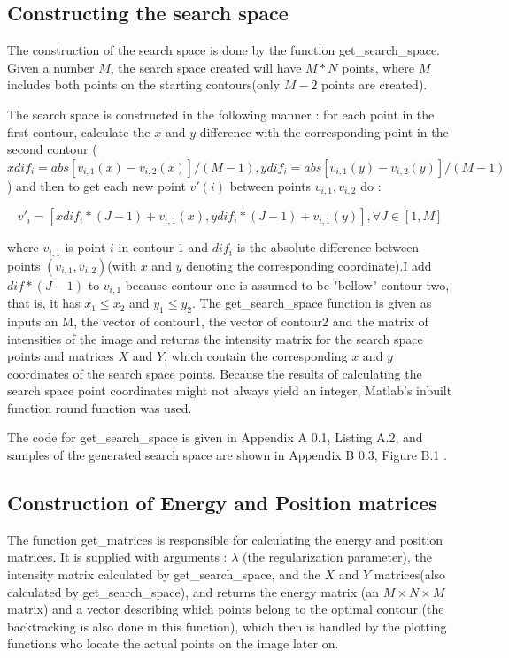 \documentclass[12pt,onecolumn,a4paper]{report}
\begin{document}
\subsection{Constructing the search space}
The construction of the search space is done by the function {\pica get\_search\_space}. Given a number $M$, the search space created will have $M*N$ points, where $M$ includes both points on the starting contours(only $M-2$ points are created). 

The search space is constructed in the following manner : 
for each point in the first contour, calculate the $x$ and $y$ difference with the corresponding point in the second contour ($ xdif_i = abs[v_{i,1}(x) - v_{i,2}(x)]/(M-1),ydif_i = abs[v_{i,1}(y) - v_{i,2}(y)]/(M-1) $) and then to get each new point $v'(i)$ between points $v_{i,1},v_{i,2}$ do :

\begin{displaymath}
v'_i = [xdif_i*(J-1)+v_{i,1}(x),ydif_i*(J-1)+v_{i,1}(y)], \forall J \in [1,M]
\end{displaymath}

where $v_{i,1}$ is point $i$ in contour $1$ and $dif_i$ is the absolute difference between points $(v_{i,1},v_{i,2})$(with $x$ and $y$ denoting the corresponding coordinate).I add $dif*(J-1)$ to $v_{i,1}$ because contour one is assumed to be "bellow" contour two, that is, it has $x_1 \leq x_2$ and $y_1 \leq y_2$.
The {\pica get\_search\_space} function is given as inputs an M, the vector of contour1, the vector of contour2 and the matrix of intensities of the image and returns the intensity matrix for the search space points and matrices $X$ and $Y$, which contain the corresponding $x$ and $y$ coordinates of the search space points.
Because the results of calculating the search space point coordinates might not always yield an integer, Matlab's inbuilt function {\pica round} function was used.

The code for {\pica get\_search\_space} is given in Appendix A 0.1, Listing A.2, and samples of the generated search space are shown in Appendix B 0.3, Figure B.1 . 

\subsection{Construction of Energy and Position matrices}

The function {\pica get\_matrices} is responsible for calculating the energy and position matrices. It is supplied with arguments : $\lambda$ (the regularization parameter), the intensity matrix calculated by {\pica get\_search\_space}, and the $X$ and $Y$ matrices(also calculated by {\pica get\_search\_space}), and returns the energy matrix (an $M\times N\times M$ matrix) and a vector describing which points belong to the optimal contour (the backtracking is also done in this function), which then is handled by the plotting functions who locate the actual points on the image later on.
\end{document}
